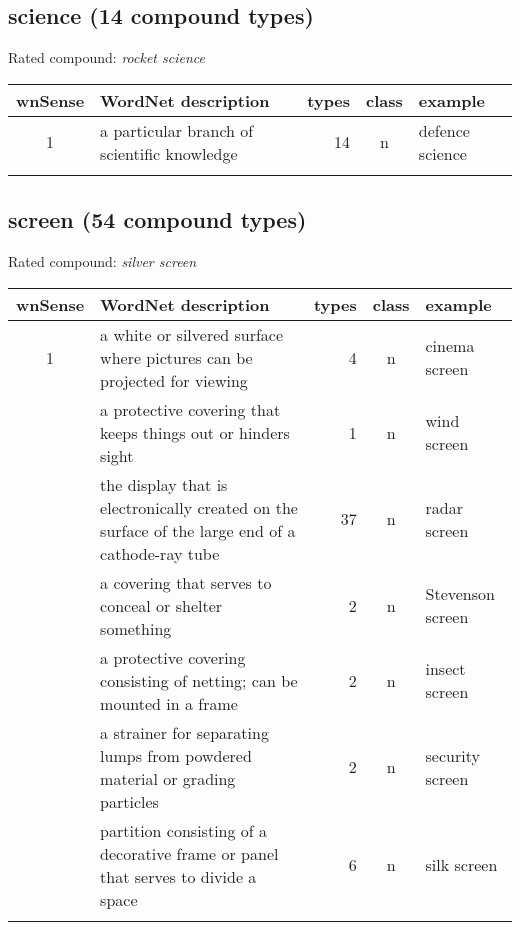 \subsection{science   (14 compound types)}
Rated compound: \emph{rocket science}

\vspace*{1ex}

\noindent
\begin{longtable}{c>{\raggedright\arraybackslash}p{5cm}rc>{\raggedright\arraybackslash}p{2cm}}\lsptoprule
{\small wnSense}&WordNet description&types&class&example\\\midrule
1&a particular branch of scientific knowledge&14&n&defence science\\\lspbottomrule
\end{longtable}

\pagebreak[4]

\subsection{screen   (54 compound types)}
Rated compound: \emph{silver screen}

\vspace*{0ex}

\noindent
\begin{longtable}{c>{\raggedright\arraybackslash}p{5cm}rc>{\raggedright\arraybackslash}p{2cm}}\lsptoprule
{\small wnSense}&WordNet description&types&class&example\\\midrule
1&a white or silvered surface where pictures can be projected for viewing&4&n&cinema screen\\\tablevspace
2&a protective covering that keeps things out or hinders sight&1&n&wind screen\\\tablevspace
3&the display that is electronically created on the surface of the large end of a cathode-ray tube&37&n&radar screen\\\tablevspace
4&a covering that serves to conceal or shelter something&2&n&Stevenson screen\\\tablevspace
5&a protective covering consisting of netting; can be mounted in a frame&2&n&insect screen\\\tablevspace
7&a strainer for separating lumps from powdered material or grading particles&2&n&security screen\\\tablevspace
8&partition consisting of a decorative frame or panel that serves to divide a space&6&n&silk screen\\\lspbottomrule
\end{longtable}
\pagebreak[4]
